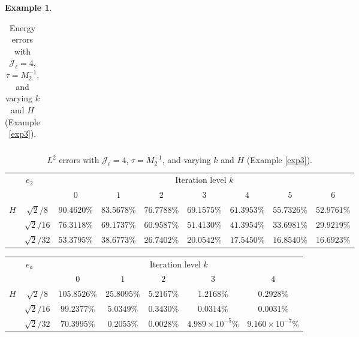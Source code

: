 \documentclass{article}[11pt]
\theoremstyle{definition}
\newtheorem{exmp}{Example}[section]
\begin{document}
\begin{exmp}
\begin{table}[ht]
\begin{tabular}{cc||ccccccc}
\hline
\end{tabular}
\caption{Energy errors with $\mathcal{J}_{\ell} = 4$, $\tau = M_2^{-1}$, and varying $k$ and $H$ (Example \ref{exp3}).}
\label{tab:exp3-v-subopt-3}
\end{table}

\begin{table}[ht]
\centering
\begin{tabular}{cc||ccccccc}
\hline
\multicolumn{2}{c||}{\multirow{2}{*}{$e_2$}}   & \multicolumn{7}{c}{Iteration level $k$}           \\ \cline{3-9} 
\multicolumn{2}{c||}{} &   $0$ & $1$   & $2$   & $3$   & $4$   &$5$ & $6$ \\ 
\hline \hline
\multicolumn{1}{c|}{\multirow{3}{*}{$H$}} & 
$\sqrt{2}/8$ & $90.4620\%$ & $83.5678\%$ & $76.7788\%$ & $69.1575\%$ & $61.3953\%$ & $55.7326\%$ & $52.9761\%$ \\
\multicolumn{1}{c|}{} &  
 $\sqrt{2}/16$ & $76.3118\%$ & $69.1737\%$ & $60.9587\%$ & $51.4130\%$ & $41.3954\%$ & $33.6981\%$ & $29.9219\%$ \\

\multicolumn{1}{c|}{} &  
 $\sqrt{2}/32$ & $53.3795\%$ & $38.6773\%$ & $26.7402\%$ & $20.0542\%$ & $17.5450\%$ & $16.8540\%$ & $16.6923\%$ \\

\hline
\end{tabular}
\caption{$L^2$ errors with $\mathcal{J}_{\ell} = 4$, $\tau = M_2^{-1}$, and varying $k$ and $H$ (Example \ref{exp3}).}
\label{tab:exp3-p-subopt-3}
\end{table}


\begin{table}[ht]
\centering
\begin{tabular}{cc||ccccc}
\hline
\multicolumn{2}{c||}{\multirow{2}{*}{$e_a$}}   & \multicolumn{5}{c}{Iteration level $k$}           \\ \cline{3-7} 
\multicolumn{2}{c||}{} &   $0$ & $1$   & $2$   & $3$   & $4$   \\ 
\hline \hline
\multicolumn{1}{c|}{\multirow{3}{*}{$H$}} & 
$\sqrt{2}/8$ & $105.8526\%$ & $25.8095\%$ & $5.2167\%$ & $1.2168\%$ & $0.2928\%$ \\
\multicolumn{1}{c|}{} &  
 $\sqrt{2}/16$ & $99.2377\%$ & $5.0349\%$ & $0.3430\%$ & $0.0314\%$ & $0.0031\%$ \\

\multicolumn{1}{c|}{} &  
 $\sqrt{2}/32$ & $70.3995\%$ & $0.2055\%$ & $0.0028\%$ & $4.989 \times 10^{-5}\%$ & $9.160 \times 10^{-7}\%$ \\


\end{tabular}
\end{table}
\end{exmp}
\end{document}
